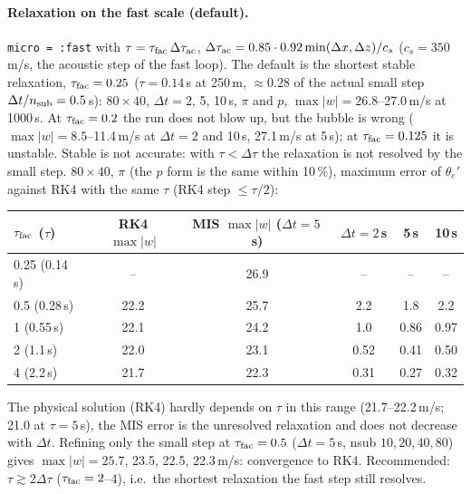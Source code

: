 \documentclass[11pt,a4paper]{article}
\newcommand{\code}[1]{\texttt{#1}}
\newcommand{\dt}{\Delta t}
\begin{document}
\paragraph{Relaxation on the fast scale (default).} \code{micro = :fast} with
$\tau=\tau_{\rm fac}\,\Delta\tau_{\rm ac}$, $\Delta\tau_{\rm ac}=0.85\cdot0.92\min(\Delta x,\Delta z)/c_s$
($c_s=350$\,m/s, the acoustic step of the fast loop). The default is the shortest stable relaxation,
$\tau_{\rm fac}=0.25$ ($\tau=0.14$\,s at 250\,m, $\approx0.28$ of the actual small step $\Delta t/n_{\rm sub}=0.5$\,s):
$80\times40$, $\dt=2$, 5, 10\,s, $\pi$ and $p$, $\max|w|=26.8$--27.0\,m/s at 1000\,s. At $\tau_{\rm fac}=0.2$ the
run does not blow up, but the bubble is wrong ($\max|w|=8.5$--11.4\,m/s at $\dt=2$ and 10\,s, 27.1\,m/s at
5\,s); at $\tau_{\rm fac}=0.125$ it is unstable. Stable is not accurate: with $\tau<\Delta\tau$ the relaxation is
not resolved by the small step. $80\times40$, $\pi$ (the $p$ form is the same within 10\,\%), maximum
error of $\theta_e'$ against RK4 with the same $\tau$ (RK4 step $\le\tau/2$):
\begin{center}\begin{tabular}{lccccc}\toprule
$\tau_{\rm fac}$ ($\tau$) & RK4 $\max|w|$ & MIS $\max|w|$ ($\dt=5$\,s) & $\dt=2$\,s & 5\,s & 10\,s\\\midrule
0.25 (0.14\,s) & -- & 26.9 & -- & -- & --\\
0.5 (0.28\,s) & 22.2 & 25.7 & 2.2 & 1.8 & 2.2\\
1 (0.55\,s) & 22.1 & 24.2 & 1.0 & 0.86 & 0.97\\
2 (1.1\,s) & 22.0 & 23.1 & 0.52 & 0.41 & 0.50\\
4 (2.2\,s) & 21.7 & 22.3 & 0.31 & 0.27 & 0.32\\\bottomrule
\end{tabular}\end{center}
The physical solution (RK4) hardly depends on $\tau$ in this range (21.7--22.2\,m/s; 21.0 at
$\tau=5$\,s), the MIS error is the unresolved relaxation and does not decrease with $\dt$. Refining only
the small step at $\tau_{\rm fac}=0.5$ ($\dt=5$\,s, nsub $10,20,40,80$) gives $\max|w|=25.7$, 23.5, 22.5,
22.3\,m/s: convergence to RK4. Recommended: $\tau\gtrsim2\Delta\tau$ ($\tau_{\rm fac}=2$--4), i.e.\ the
shortest relaxation the fast step still resolves.
\end{document}
